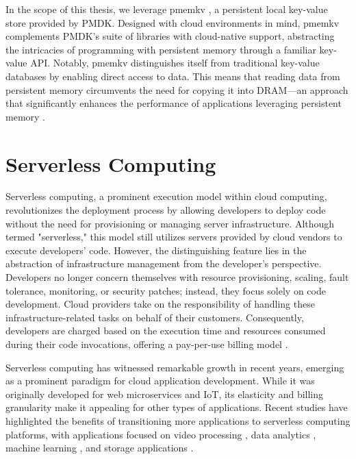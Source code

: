 In the scope of this thesis, we leverage pmemkv \cite{GitHubpm66:online}, a persistent local key-value store provided by PMDK. Designed with cloud environments in mind, pmemkv complements PMDK's suite of libraries with cloud-native support, abstracting the intricacies of programming with persistent memory through a familiar key-value API. Notably, pmemkv distinguishes itself from traditional key-value databases by enabling direct access to data. This means that reading data from persistent memory circumvents the need for copying it into DRAM—an approach that significantly enhances the performance of applications leveraging persistent memory \cite{scargall2020pmem}.

\section{Serverless Computing}
Serverless computing, a prominent execution model within cloud computing, revolutionizes the deployment process by allowing developers to deploy code without the need for provisioning or managing server infrastructure. Although termed "serverless," this model still utilizes servers provided by cloud vendors to execute developers' code. However, the distinguishing feature lies in the abstraction of infrastructure management from the developer's perspective. Developers no longer concern themselves with resource provisioning, scaling, fault tolerance, monitoring, or security patches; instead, they focus solely on code development. Cloud providers take on the responsibility of handling these infrastructure-related tasks on behalf of their customers. Consequently, developers are charged based on the execution time and resources consumed during their code invocations, offering a pay-per-use billing model \cite{jonas2019cloud,romero2021faat,klimovic2018pocket}.

Serverless computing has witnessed remarkable growth in recent years, emerging as a prominent paradigm for cloud application development. While it was originally developed for web microservices and IoT, its elasticity and billing granularity make it appealing for other types of applications. Recent studies have highlighted the benefits of transitioning more applications to serverless computing platforms, with applications focused on video processing \cite{fouladi2017encoding}, data analytics \cite{gimenez2019framework,carver2020wukong,klimovic2018pocket}, machine learning \cite{carreira2019cirrus,feng2018exploring}, and storage applications \cite{10.14778/3587136.3587139,jonas2019cloud}.

